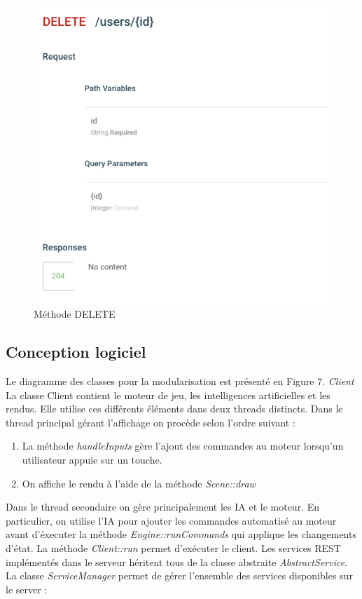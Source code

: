 \documentclass[a4paper,12pt]{article}
\begin{document}
    \begin{figure}[p]
    \includegraphics{DELETE.png}
    \caption{\label{uml:module}Méthode DELETE}
    \end{figure}
    
    
    
    \clearpage
    \subsection{Conception logiciel}
    Le diagramme des classes pour la modularisation est présenté en Figure 7.
    \emph{Client} La classe Client contient le moteur de jeu, les intelligences artificielles et les rendus. Elle utilise ces différents éléments dans deux threads distincts. Dans le thread principal gérant l'affichage on procède selon l'ordre suivant :
\begin{enumerate}
\item La méthode \emph{handleInputs} gère l'ajout des commandes au moteur lorsqu'un utilisateur appuie sur un touche.
\item On affiche le rendu à l'aide de la méthode \emph{Scene::draw}
\end{enumerate}

 Dans le thread secondaire on gère principalement les IA et le moteur. En particulier, on  utilise l'IA pour ajouter les commandes automatisé au moteur avant d'éxecuter la méthode \emph{Engine::runCommands} qui applique les changements d'état.
    La méthode \emph{Client::run} permet d'exécuter le client. 
    Les services REST implémentés dans le serveur héritent tous de la classe abstraite \emph{AbstractService}.  La classe \emph{ServiceManager} permet de gérer l'ensemble des services disponibles sur le server :
    
\end{document}
